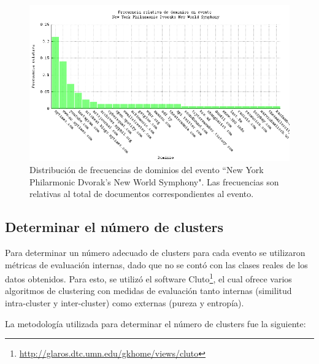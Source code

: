 \documentclass[upright, contnum]{umemoria}
\begin{document}
\begin{figure}[h]
  \centering
  \includegraphics[width=14cm]{./img/dvorak-domain-freqs.png}
  \caption[Dominios evento 4]
   {Distribución de frecuencias de dominios del evento ``New York
  Philarmonic Dvorak's New World Symphony"\label{fig:dvorak-domains}. Las frecuencias son relativas al total de
  documentos correspondientes al evento.}
\end{figure}

\subsection{Determinar el número de clusters}
\label{sec-4.4.2}


Para determinar un número adecuado de clusters para cada evento se
utilizaron métricas de evaluación internas, dado que no se contó con
las clases reales de los datos obtenidos. Para esto, se utilizó el
software Cluto\footnote{\href{http://glaros.dtc.umn.edu/gkhome/views/cluto}{http://glaros.dtc.umn.edu/gkhome/views/cluto} }, el
cual ofrece varios algoritmos de clustering con medidas de evaluación
tanto internas (similitud intra-cluster y inter-cluster) como externas
(pureza y entropía).

La metodología utilizada para determinar el número de clusters fue la
siguiente:
\end{document}
